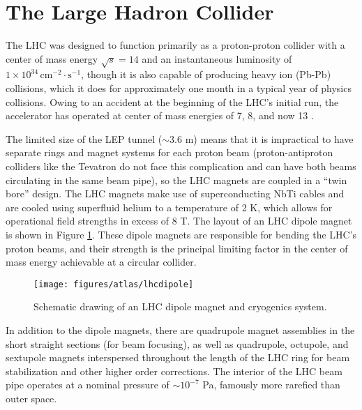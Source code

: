 \section{The Large Hadron Collider}
The LHC was designed to function primarily as a proton-proton collider with a center of mass energy $\sqrt{s}=14$ \TeV and an instantaneous luminosity of $1\times10^{34}\,\text{cm}^{-2}\cdot\text{s}^{-1}$, though it is also capable of producing heavy ion (Pb-Pb) collisions, which it does for approximately one month in a typical year of physics collisions.  Owing to an accident at the beginning of the LHC's initial run, the accelerator has operated at center of mass energies of 7, 8, and now 13 \TeV.

The limited size of the LEP tunnel ($\sim 3.6$ m) means that it is impractical to have separate rings and magnet systems for each proton beam (proton-antiproton colliders like the Tevatron do not face this complication and can have both beams circulating in the same beam pipe), so the LHC magnets are coupled in a ``twin bore'' design.  The LHC magnets make use of superconducting NbTi cables and are cooled using superfluid helium to a temperature of 2 K, which allows for operational field strengths in excess of 8 T.  The layout of an LHC dipole magnet is shown in Figure \ref{fig:lhcdipole}.  These dipole magnets are responsible for bending the LHC's proton beams, and their strength is the principal limiting factor in the center of mass energy achievable at a circular collider.

\begin{figure}[!htbp]\captionsetup{justification=centering}
  \centering
  \texttt{[image: figures/atlas/lhcdipole]}
  \caption{Schematic drawing of an LHC dipole magnet and cryogenics system.}
  \label{fig:lhcdipole}
\end{figure}

In addition to the dipole magnets, there are quadrupole magnet assemblies in the short straight sections (for beam focusing), as well as quadrupole, octupole, and sextupole magnets interspersed throughout the length of the LHC ring for beam stabilization and other higher order corrections.  The interior of the LHC beam pipe operates at a nominal pressure of $\sim10^{-7}$ Pa, famously more rarefied than outer space.

